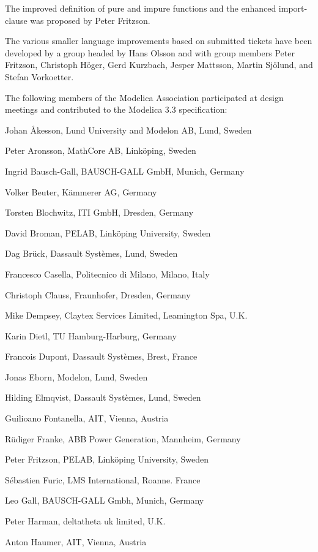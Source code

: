 The improved definition of pure and impure functions and the enhanced import-clause was proposed by Peter Fritzson.

The various smaller language improvements based on submitted tickets
have been developed by a group headed by Hans Olsson and with group
members Peter Fritzson, Christoph Höger, Gerd Kurzbach, Jesper Mattsson,
Martin Sjölund, and Stefan Vorkoetter.

The following members of the Modelica Association participated at design
meetings and contributed to the Modelica 3.3 specification:
\begin{contributors}
\item Johan Åkesson, Lund University and Modelon AB, Lund, Sweden
\item Peter Aronsson, MathCore AB, Linköping, Sweden
\item Ingrid Bausch-Gall, BAUSCH-GALL GmbH, Munich, Germany
\item Volker Beuter, Kämmerer AG, Germany
\item Torsten Blochwitz, ITI GmbH, Dresden, Germany
\item David Broman, PELAB, Linköping University, Sweden
\item Dag Brück, Dassault Systèmes, Lund, Sweden
\item Francesco Casella, Politecnico di Milano, Milano, Italy
\item Christoph Clauss, Fraunhofer, Dresden, Germany
\item Mike Dempsey, Claytex Services Limited, Leamington Spa, U.K.
\item Karin Dietl, TU Hamburg-Harburg, Germany
\item Francois Dupont, Dassault Systèmes, Brest, France
\item Jonas Eborn, Modelon, Lund, Sweden
\item Hilding Elmqvist, Dassault Systèmes, Lund, Sweden
\item Guilioano Fontanella, AIT, Vienna, Austria
\item Rüdiger Franke, ABB Power Generation, Mannheim, Germany
\item Peter Fritzson, PELAB, Linköping University, Sweden
\item Sébastien Furic, LMS International, Roanne. France
\item Leo Gall, BAUSCH-GALL Gmbh, Munich, Germany
\item Peter Harman, deltatheta uk limited, U.K.
\item Anton Haumer, AIT, Vienna, Austria

\end{contributors}
